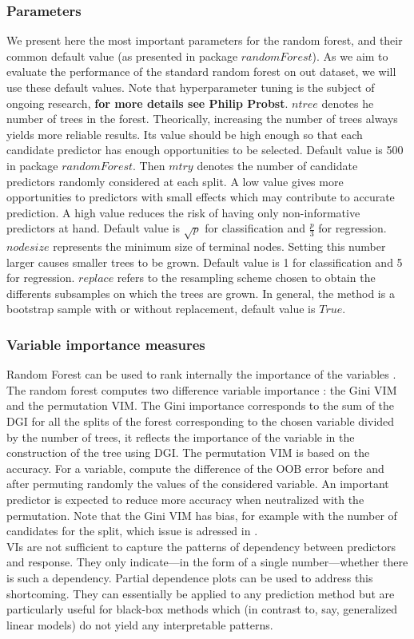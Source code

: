 \documentclass[12pt]{article}
\begin{document}

\newpage
\subsubsection{Parameters}
We present here the most important parameters for the random forest, and their common default value (as presented in package $randomForest$). As we aim to evaluate the performance of the standard random forest on out dataset, we will use these default values. Note that hyperparameter tuning is the subject of ongoing research,  \textbf{for more details see Philip Probst}. $ntree$ denotes he number of trees in the forest. Theorically, increasing the number of trees always yields more reliable results. Its value should be high enough so that each candidate predictor has enough opportunities to be selected. Default value is 500 in package $randomForest$. Then $mtry$ denotes the number of candidate predictors randomly considered at each split. A low value gives more opportunities to predictors with small effects which may contribute to accurate prediction. A high value reduces the risk of having only non-informative predictors at hand. Default value is $\sqrt{p}$ for classification and $\frac{p}{3}$ for regression. $nodesize$ represents the minimum size of terminal nodes. Setting this number larger causes smaller trees to be grown. Default value is 1 for classification and 5 for regression. $replace$ refers to the resampling scheme chosen to obtain the differents subsamples on which the trees are grown. In general, the method is a bootstrap sample with or without replacement, default value is $True$. 

\subsubsection{Variable importance measures}
\label{subsubsec:VIM}
Random Forest can be used to rank internally the importance of the variables \citep{breiman2001random}. The random forest computes two difference variable importance : the Gini VIM and the permutation VIM. The Gini importance corresponds to the sum of the DGI for all the splits of the forest corresponding to the chosen variable divided by the number of trees, it reflects the importance of the variable in the construction of the tree using DGI. The permutation VIM is based on the accuracy. For a variable, compute the difference of the OOB error before and after permuting randomly the values of the considered variable. An important predictor is expected to reduce more accuracy when neutralized with the permutation. Note that the Gini VIM has bias, for example with the number of candidates for the split, which issue is adressed in \citet{strobl2007bias}. \\
VIs are not sufficient to capture the patterns of dependency between predictors and response. They only indicate---in the form of a single number---whether there is such a dependency. Partial dependence plots can be used to address this shortcoming. They can essentially be applied to any prediction method but are particularly useful for black-box methods which (in contrast to, say, generalized linear models) do not yield any interpretable patterns.
\end{document}
